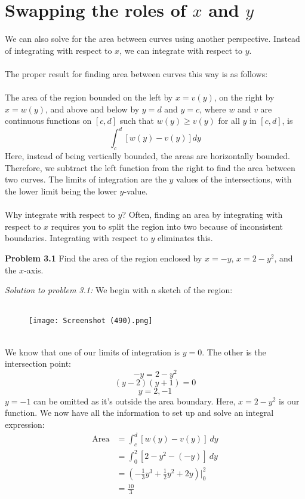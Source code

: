\documentclass[11pt]{scrartcl}
\begin{document}
\section{Swapping the roles of $x$ and $y$}
\noindent 
We can also solve for the area between curves using another perspective. Instead of integrating with respect to $x$, we can integrate with respect to $y$. \\
\\
\noindent 
The proper result for finding area between curves this way is as follows: \\
\\
\noindent 
The area of the region bounded on the left by $x=v(y)$, on the right by $x=w(y)$, and above and below by $y=d$ and $y=c$, where $w$ and $v$ are continuous functions on $[c,d]$ such that $w(y) \ge v(y)$ for all $y$ in $[c,d]$, is 
$$\int_c^d[w(y)-v(y)]dy$$
\noindent 
Here, instead of being vertically bounded, the areas are horizontally bounded. Therefore, we subtract the left function from the right to find the area between two curves. The limits of integration are the $y$ values of the intersections, with the lower limit being the lower $y$-value. \\
\\
\noindent 
Why integrate with respect to $y$? Often, finding an area by integrating with respect to $x$ requires you to split the region into two because of inconsistent boundaries. Integrating with respect to $y$ eliminates this. 
\begin{tcolorbox}[colback=purple!5!white,colframe=purple!75!black]
\textbf{Problem 3.1} Find the area of the region enclosed by $x=-y$, $x=2-y^2$, and the $x$-axis. 
\end{tcolorbox}
\noindent 
\textit{Solution to problem 3.1:} We begin with a sketch of the region:\\
\\
\begin{figure}[htp]
    \centering
    \texttt{[image: Screenshot (490).png]}
\end{figure} \\
\noindent 
We know that one of our limits of integration is $y=0$. The other is the intersection point: 
$$-y=2-y^2$$
$$(y-2)(y+1)=0$$
$$y=2,-1$$
$y=-1$ can be omitted as it's outside the area boundary. Here, $x=2-y^2$ is our  function. We now have all the information to set up and solve an integral expression: 
\begin{align*}
    \text{Area} &= \int_c^d[w(y)-v(y)] \ dy \\
                &=\int_0^2[2-y^2-(-y)] \ dy \\
                &=\left(-\frac{1}{3}y^3+\frac{1}{2}y^2+2y\right)\biggr \rvert_0^2 \\
                &=\frac{10}{3}
\end{align*}
\end{document}
